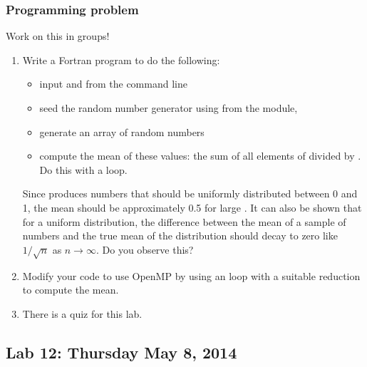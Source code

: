 \documentclass[letterpaper,10pt,english]{sphinxmanual}
\begin{document}
\subsubsection{Programming problem}
\label{labs/lab11:programming-problem}
Work on this in groups!
\begin{enumerate}
\item {} 
Write a Fortran program to do the following:
\begin{itemize}
\item {} 
input  and  from the command line

\item {} 
seed the random number generator using  from the
 module,

\item {} 
generate an array  of  random numbers

\item {} 
compute the mean of these values:  the sum of all elements of 
divided by .  Do this with a  loop.

\end{itemize}

Since  produces numbers that should be uniformly
distributed between 0 and 1, the mean should be approximately 0.5
for large .  It can also be shown that for a uniform
distribution, the difference between the mean of a sample of  numbers
and the true mean of the distribution should decay to zero like
\(1/\sqrt{n}\) as \(n\longrightarrow\infty\).  Do you observe this?

\item {} 
Modify your code to use OpenMP by using an  loop
with a suitable reduction to compute the mean.

\item {} 
There is a quiz for this lab.

\end{enumerate}


\subsection{Lab 12: Thursday May 8, 2014}
\label{labs/lab12::doc}\label{labs/lab12:lab12}\label{labs/lab12:lab-12-thursday-may-8-2014}
\end{document}
